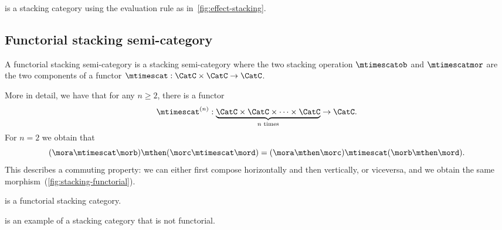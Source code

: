 \begin{lemma}
    \Effects is a stacking category using the evaluation rule as in~\cref{fig:effect-stacking}.
\end{lemma}


\subsection{Functorial stacking semi-category}

\begin{ctdefinition}
    \label{def:functorial-stacking-semi-cat}
    A functorial stacking semi-category is a stacking semi-category where the two stacking operation $\mtimescatob$ and $\mtimescatmor$ are the two components of a functor $\mtimescat: \CatC \times \CatC \to \CatC$.
\end{ctdefinition}

More in detail, we have that for any $n \geq 2$, there is a functor
% 
\begin{equation}
    \mtimescat^{(n)}: \underbrace {\CatC \times \CatC \times \cdots \times \CatC}_{\text{$n$ times}} \to \CatC.
\end{equation}
% 
For $n=2$ we obtain that
% 
\begin{equation}
    (\mora \mtimescat \morb )
    \mthen (\morc \mtimescat \mord )
    =
    (\mora \mthen \morc ) \mtimescat (\morb \mthen \mord ).
\end{equation}
% 
This describes a commuting property: we can either first compose horizontally and then vertically, or viceversa, and we obtain the same morphism~(\cref{fig:stacking-functorial}).

\begin{figure*}[h]
    \centering
    \caption{Commutation of stacking and composition}
    \label{fig:stacking-functorial}
\end{figure*}

\begin{lemma}
    \SetStar is  a functorial stacking category.
\end{lemma}

\Effects is an example of a stacking category that is not functorial.

